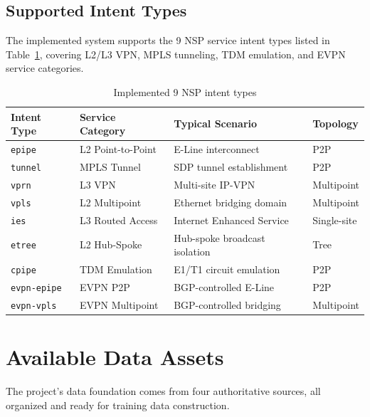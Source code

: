 \documentclass[12pt, a4paper]{article}
\newcommand{\intenttype}[1]{\texttt{#1}}
\newcommand{\nsp}{\textsc{NSP}}
\begin{document}
\subsection{Supported Intent Types}

The implemented system supports the 9 \nsp{} service intent types listed in Table~\ref{tab:intent-types}, covering L2/L3 VPN, MPLS tunneling, TDM emulation, and EVPN service categories.

\begin{table}[H]
\centering
\caption{Implemented 9 NSP intent types}
\label{tab:intent-types}
\small
\begin{tabular}{llll}
\toprule
\textbf{Intent Type} & \textbf{Service Category} & \textbf{Typical Scenario} & \textbf{Topology} \\
\midrule
\intenttype{epipe}       & L2 Point-to-Point & E-Line interconnect         & P2P \\
\intenttype{tunnel}      & MPLS Tunnel        & SDP tunnel establishment    & P2P \\
\intenttype{vprn}        & L3 VPN             & Multi-site IP-VPN           & Multipoint \\
\intenttype{vpls}        & L2 Multipoint      & Ethernet bridging domain    & Multipoint \\
\intenttype{ies}         & L3 Routed Access   & Internet Enhanced Service   & Single-site \\
\intenttype{etree}       & L2 Hub-Spoke       & Hub-spoke broadcast isolation & Tree \\
\intenttype{cpipe}       & TDM Emulation      & E1/T1 circuit emulation     & P2P \\
\intenttype{evpn-epipe}  & EVPN P2P           & BGP-controlled E-Line       & P2P \\
\intenttype{evpn-vpls}   & EVPN Multipoint    & BGP-controlled bridging     & Multipoint \\
\bottomrule
\end{tabular}
\end{table}

\section{Available Data Assets}
\label{sec:data-assets}

The project's data foundation comes from four authoritative sources, all organized and ready for training data construction.
\end{document}

